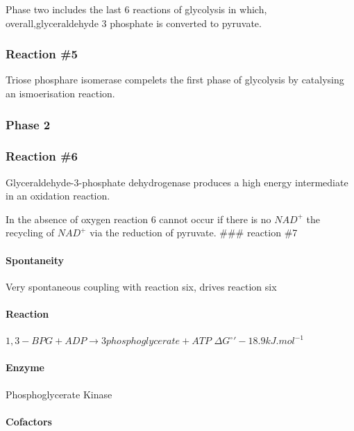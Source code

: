 \documentclass[]{article}
\let\oldparagraph\paragraph
\renewcommand{\paragraph}[1]{\oldparagraph{#1}\mbox{}}
\begin{document}
Phase two includes the last 6 reactions of glycolysis in which,
overall,glyceraldehyde 3 phosphate is converted to pyruvate.

\hypertarget{reaction-5}{%
\subsubsection{Reaction \#5}\label{reaction-5}}

Triose phosphare isomerase compelets the first phase of glycolysis by
catalysing an ismoerisation reaction.

\hypertarget{phase-2-1}{%
\subsubsection{Phase 2}\label{phase-2-1}}

\hypertarget{reaction-6}{%
\subsubsection{Reaction \#6}\label{reaction-6}}

Glyceraldehyde-3-phosphate dehydrogenase produces a high energy
intermediate in an oxidation reaction.

In the absence of oxygen reaction 6 cannot occur if there is no
\(NAD^+\) the recycling of \(NAD^+\) via the reduction of pyruvate.
\#\#\# reaction \#7

\hypertarget{spontaneity}{%
\paragraph{Spontaneity}\label{spontaneity}}

Very spontaneous coupling with reaction six, drives reaction six

\hypertarget{reaction}{%
\paragraph{Reaction}\label{reaction}}

\(1,3-BPG+ADP \rightarrow 3 phosphoglycerate+ATP\)
\(\Delta G^\circ ' -18.9kJ.mol^{-1}\)

\hypertarget{enzyme-2}{%
\paragraph{Enzyme}\label{enzyme-2}}

Phosphoglycerate Kinase

\hypertarget{cofactors}{%
\paragraph{Cofactors}\label{cofactors}}
\end{document}
